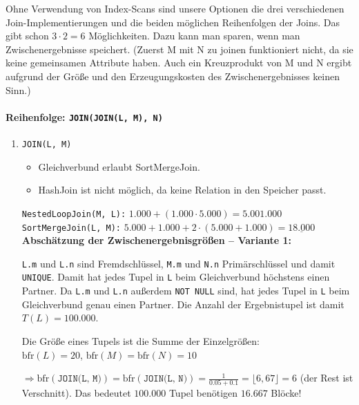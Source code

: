 \begin{enumerate}[a)]
\begin{enumerate}[i)]
\begin{solution}
		Ohne Verwendung von Index-Scans sind unsere Optionen die drei verschiedenen Join-Implementierungen und die beiden möglichen Reihenfolgen der Joins.
		Das gibt schon $3 \cdot 2 = 6$ Möglichkeiten.
		Dazu kann man sparen, wenn man Zwischenergebnisse speichert.
		(Zuerst M mit N zu joinen funktioniert nicht, da sie keine gemeinsamen Attribute haben.
		Auch ein Kreuzprodukt von M und N ergibt aufgrund der Größe und den Erzeugungskosten des Zwischenergebnisses keinen Sinn.)

		\paragraph{\color{solutioncolor}Reihenfolge: \texttt{JOIN(JOIN(L, M), N)}}

		\begin{enumerate}[1.]

			\item \texttt{JOIN(L, M)}
			  \begin{itemize}
				  \item Gleichverbund erlaubt SortMergeJoin.
				  \item HashJoin ist nicht möglich, da keine Relation in den Speicher passt.
			  \end{itemize}
			  \texttt{NestedLoopJoin(M, L):} $1.000 + (1.000 \cdot 5.000) = 5.001.000$ \\
			  \texttt{SortMergeJoin(L, M):} $5.000 + 1.000 + 2 \cdot (5.000 + 1.000) = \underline{18.000}$ \\

			  \textbf{Abschätzung der Zwischenergebnisgrößen -- Variante 1:}

			  \texttt{L.m} und \texttt{L.n} sind Fremdschlüssel, \texttt{M.m} und \texttt{N.n} Primärschlüssel und damit \texttt{UNIQUE}.
			  Damit hat jedes Tupel in \texttt{L} beim Gleichverbund höchstens einen Partner.
			  Da \texttt{L.m} und \texttt{L.n} außerdem \texttt{NOT NULL} sind, hat jedes Tupel in \texttt{L} beim Gleichverbund genau einen Partner.
			  Die Anzahl der Ergebnistupel ist damit $T(L)=100.000$.

			  Die Größe eines Tupels ist die Summe der Einzelgrößen: \\
			  $\mathrm{bfr}(L) = 20$, $\mathrm{bfr}(M)= \mathrm{bfr}(N) = 10$

			  $\Rightarrow \mathrm{bfr}(\texttt{JOIN(L, M)}) = \mathrm{bfr}(\texttt{JOIN(L, N)})= \frac{1}{0.05 + 0.1} = \lfloor6,67\rfloor = 6$ (der Rest ist Verschnitt).
			  Das bedeutet $100.000$ Tupel benötigen $16.667$ Blöcke!


\end{enumerate}
\end{solution}
\end{enumerate}
\end{enumerate}
